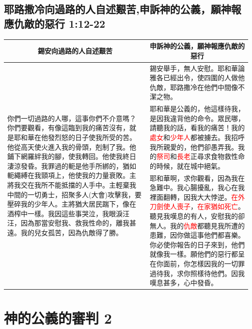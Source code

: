 \subsection{耶路撒冷向過路的人自述艱苦,申訴神的公義，願神報應仇敵的惡行 1:12-22}
\begin{table}[H]
\centering
\begin{tabular}{p{7.25cm}|p{10.0cm}}\hline\hline
\multicolumn{1}{c|}{錫安向過路的人自述艱苦}&\multicolumn{1}{c}{申訴神的公義，願神報應仇敵的惡行}\\\hline
\multirow{3}{7.5cm}{你們一切過路的人哪，這事你們不介意嗎？你們要觀看，有像這臨到我的痛苦沒有，就是耶和華在他發烈怒的日子使我所受的苦。他從高天使火進入我的骨頭，剋制了我。他鋪下網羅絆我的腳，使我轉回。他使我終日淒涼發昏。我罪過的軛是他手所綁的，猶如軛繩縛在我頸項上，他使我的力量衰敗。主將我交在我所不能抵擋的人手中。主輕棄我中間的一切勇士，招聚多人(大會)攻擊我，要壓碎我的少年人。主將猶大居民踹下，像在酒榨中一樣。我因這些事哭泣，我眼淚汪汪，因為那當安慰我、救我性命的，離我甚遠。我的兒女孤苦，因為仇敵得了勝。}
&錫安舉手，無人安慰。耶和華論雅各已經出令，使四圍的人做他仇敵，耶路撒冷在他們中間像不潔之物。\\\cline{2-2}

&耶和華是公義的，他這樣待我，是因我違背他的命令。眾民哪，請聽我的話，看我的痛苦！我的\textcolor{red}{處女}和\textcolor{red}{少年人}都被擄去。我招呼我所親愛的，他們卻愚弄我。我的\textcolor{red}{祭司}和\textcolor{red}{長老}正尋求食物救性命的時候，就在城中絕氣。\\\cline{2-2}

&耶和華啊，求你觀看，因為我在急難中。我心腸擾亂，我心在我裡面翻轉，因我大大悖逆。\textcolor{red}{在外刀劍使人喪子}，\textcolor{red}{在家猶如死亡}。聽見我嘆息的有人，安慰我的卻無人。我的\textcolor{red}{仇敵}都聽見我所遭的患難，因你做這事他們都喜樂。你必使你報告的日子來到，他們就像我一樣。願他們的惡行都呈在你面前，你怎樣因我的一切罪過待我，求你照樣待他們。因我嘆息甚多，心中發昏。\\\hline
\end{tabular}
\end{table}


\section{神的公義的審判  2}
